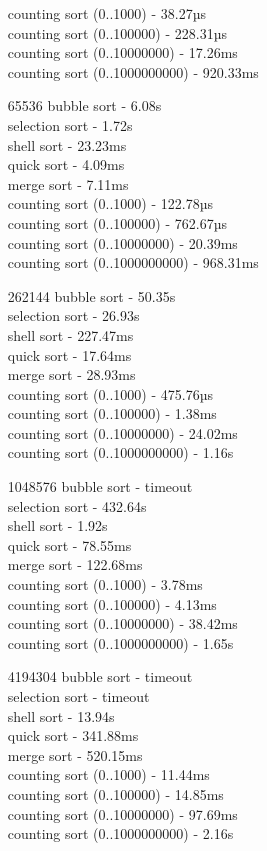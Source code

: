 \documentclass{article}
\begin{document}
\begin{normalsize}
\begin{enumerate}
			counting sort (0..1000) - 38.27µs\\
			counting sort (0..100000) - 228.31µs\\
			counting sort (0..10000000) - 17.26ms\\
			counting sort (0..1000000000) - 920.33ms
			\item [65536] bubble sort - 6.08s\\
			selection sort - 1.72s\\
			shell sort - 23.23ms\\
			quick sort - 4.09ms\\
			merge sort - 7.11ms\\
			counting sort (0..1000) - 122.78µs\\
			counting sort (0..100000) - 762.67µs\\
			counting sort (0..10000000) - 20.39ms\\
			counting sort (0..1000000000) - 968.31ms
			\item [262144] bubble sort - 50.35s\\
			selection sort - 26.93s\\
			shell sort - 227.47ms\\
			quick sort - 17.64ms\\
			merge sort - 28.93ms\\
			counting sort (0..1000) - 475.76µs\\
			counting sort (0..100000) - 1.38ms\\
			counting sort (0..10000000) - 24.02ms\\
			counting sort (0..1000000000) - 1.16s
			\item [1048576] bubble sort - timeout\\
			selection sort - 432.64s\\
			shell sort - 1.92s\\
			quick sort - 78.55ms\\
			merge sort - 122.68ms\\
			counting sort (0..1000) - 3.78ms\\
			counting sort (0..100000) - 4.13ms\\
			counting sort (0..10000000) - 38.42ms\\
			counting sort (0..1000000000) - 1.65s
			\item [4194304] bubble sort - timeout\\
			selection sort - timeout\\
			shell sort - 13.94s\\
			quick sort - 341.88ms\\
			merge sort - 520.15ms\\
			counting sort (0..1000) - 11.44ms\\
			counting sort (0..100000) - 14.85ms\\
			counting sort (0..10000000) - 97.69ms\\
			counting sort (0..1000000000) - 2.16s
		\end{enumerate}
		

\end{normalsize}
\end{document}
